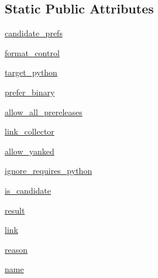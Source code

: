 \subsection*{Static Public Attributes}
\begin{DoxyCompactItemize}
\item 
\hyperlink{classpip_1_1__internal_1_1index_1_1package__finder_1_1PackageFinder_a12987e8cc4ede45e4e1322d5780cbcaf}{candidate\+\_\+prefs}
\item 
\hyperlink{classpip_1_1__internal_1_1index_1_1package__finder_1_1PackageFinder_af41c5f14312febfe0356c11130402ad4}{format\+\_\+control}
\item 
\hyperlink{classpip_1_1__internal_1_1index_1_1package__finder_1_1PackageFinder_a6bbd92920ba6940fe3fa2c6d9a914c36}{target\+\_\+python}
\item 
\hyperlink{classpip_1_1__internal_1_1index_1_1package__finder_1_1PackageFinder_a765d0f978ec5a70a7f3fe889c6893507}{prefer\+\_\+binary}
\item 
\hyperlink{classpip_1_1__internal_1_1index_1_1package__finder_1_1PackageFinder_a9c1cd175dffd7cd81a055b8dd5eaaf74}{allow\+\_\+all\+\_\+prereleases}
\item 
\hyperlink{classpip_1_1__internal_1_1index_1_1package__finder_1_1PackageFinder_a7e81eed08ce61ac1b5c9647893e5f72f}{link\+\_\+collector}
\item 
\hyperlink{classpip_1_1__internal_1_1index_1_1package__finder_1_1PackageFinder_ace9dcc74db60bf07937d69673272316c}{allow\+\_\+yanked}
\item 
\hyperlink{classpip_1_1__internal_1_1index_1_1package__finder_1_1PackageFinder_a019eb81ab1fa05273b20ea67b29c4ac0}{ignore\+\_\+requires\+\_\+python}
\item 
\hyperlink{classpip_1_1__internal_1_1index_1_1package__finder_1_1PackageFinder_ad0dc7b2eea8e424e850c13d114c9dd3c}{is\+\_\+candidate}
\item 
\hyperlink{classpip_1_1__internal_1_1index_1_1package__finder_1_1PackageFinder_a5a827b198c1481ebcbe77316732fd7ce}{result}
\item 
\hyperlink{classpip_1_1__internal_1_1index_1_1package__finder_1_1PackageFinder_a49fbe92b5f7d3b4ecb92d240af8bb6c3}{link}
\item 
\hyperlink{classpip_1_1__internal_1_1index_1_1package__finder_1_1PackageFinder_afe54ee9fbbea1b502ac761cdb03e189c}{reason}
\item 
\hyperlink{classpip_1_1__internal_1_1index_1_1package__finder_1_1PackageFinder_a4d1742e142f894545c615b17001f2c78}{name}
\item 

\end{DoxyCompactItemize}
